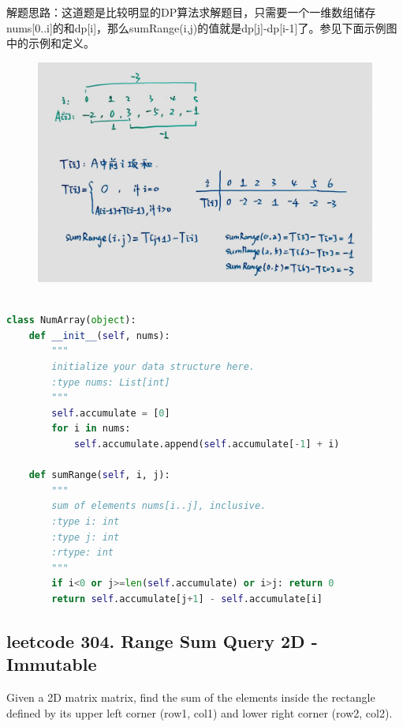 \documentclass[a4paper,10pt]{article}
\begin{document}
\begin{CJK*}{UTF8}{gbsn}
\noindent 解题思路：这道题是比较明显的DP算法求解题目，只需要一个一维数组储存nums[0..i]的和dp[i]，那么sumRange(i,j)的值就是dp[j]-dp[i-1]了。参见下面示例图中的示例和定义。
\end{CJK*}

\begin{figure}[h]
\includegraphics[width=\textwidth]{leetcode303.jpg}
\centering\\
\end{figure}

\begin{lstlisting}[language=Python, caption=Problem303. Range Sum Query - Immutable]

class NumArray(object):
    def __init__(self, nums):
        """
        initialize your data structure here.
        :type nums: List[int]
        """
        self.accumulate = [0]
        for i in nums:
            self.accumulate.append(self.accumulate[-1] + i)

    def sumRange(self, i, j):
        """
        sum of elements nums[i..j], inclusive.
        :type i: int
        :type j: int
        :rtype: int
        """
        if i<0 or j>=len(self.accumulate) or i>j: return 0
        return self.accumulate[j+1] - self.accumulate[i]
\end{lstlisting}




\subsection{leetcode 304. Range Sum Query 2D - Immutable}
Given a 2D matrix matrix, find the sum of the elements inside the rectangle defined by its upper left corner (row1, col1) and lower right corner (row2, col2).
\end{document}
